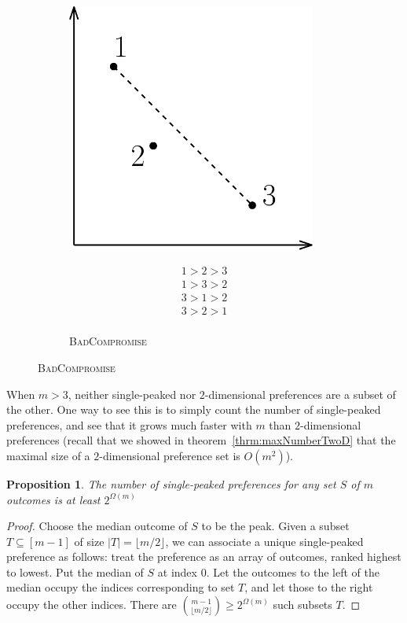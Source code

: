 \documentclass[12pt]{article}
\newtheorem{proposition}[theorem]{Proposition}
\newcommand{\1}[1]{\mathds{1}[{#1}]}
\begin{document}
\begin{figure}[h]
\begin{subfigure}[t]{0.45\textwidth}
\begin{minipage}{0.55\textwidth}
        \includegraphics[width=0.9\textwidth]{figures/exBadComp}
      \end{minipage}\hfill
      \begin{minipage}{0.45\textwidth}
        \begin{align*}
          1 > 2 > 3 \\
          1 > 3 > 2 \\
          3 > 1 > 2 \\
          3 > 2 > 1 \\
        \end{align*}
      \end{minipage}
      \caption{\textsc{BadCompromise}}
      \label{fig:gull}
    \end{subfigure}
  \end{figure}

  When $m>3$, neither single-peaked nor $2$-dimensional preferences
  are a subset of the other. One way to see this is to simply
  count the number of single-peaked preferences, and see that it
  grows much faster with $m$ than $2$-dimensional preferences
  (recall that we showed in theorem~\ref{thrm:maxNumberTwoD}
  that the maximal size of a $2$-dimensional
  preference set is $O(m^2)$).
  \begin{proposition}
    The number of single-peaked preferences for any set $S$ of $m$ outcomes
    is at least $2^{\Omega(m)}$
  \end{proposition}
  \begin{proof}
    Choose the median outcome of $S$ to be the peak.
    Given a subset $T\subseteq [m-1]$ of size $|T| = \lfloor m/2\rfloor$,
    we can associate a
    unique single-peaked preference as follows:
    treat the preference as an array of outcomes, ranked highest to lowest.
    Put the median of $S$ at index $0$.
    Let the outcomes to the left of the median occupy the indices corresponding
    to set $T$, and let those to the right occupy the other indices.
    There are ${m-1 \choose \lfloor m/2\rfloor } \ge 2^{\Omega(m)}$ such
    subsets $T$.
  \end{proof}
\end{document}
